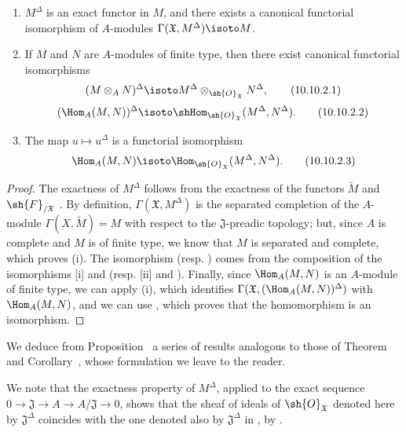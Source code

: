 \begin{proposition}[10.10.2]
\label{I.10.10.2}
\medskip\noindent
\begin{enumerate}
  \item[\rm{(i)}] $M^\Delta$ is an exact functor in $M$, and there exists a canonical functorial isomorphism of $A$-modules $\Gamma(\mathfrak{X},M^\Delta)\isoto M$.
  \item[\rm{(ii)}] If $M$ and $N$ are $A$-modules of finite type, then there exist canonical functorial isomorphisms
    \[
    \label{I.10.10.2.1}
      (M\otimes_A N)^\Delta\isoto M^\Delta\otimes_{\sh{O}_\mathfrak{X}}N^\Delta,
      \tag{10.10.2.1}
    \]
    \[
    \label{I.10.10.2.2}
      (\Hom_A(M,N))^\Delta\isoto\shHom_{\sh{O}_\mathfrak{X}}(M^\Delta,N^\Delta).
      \tag{10.10.2.2}
    \]
  \item[\rm{(iii)}] The map $u\mapsto u^\Delta$ is a functorial isomorphism
    \[
    \label{I.10.10.2.3}
      \Hom_A(M,N)\isoto\Hom_{\sh{O}_\mathfrak{X}}(M^\Delta,N^\Delta).
      \tag{10.10.2.3}
    \]
\end{enumerate}
\end{proposition}

\begin{proof}
The exactness of $M^\Delta$ follows from the exactness of the functors $\widetilde{M}$  and $\sh{F}_{/\mathfrak{X}}$ .
By definition, $\Gamma(\mathfrak{X},M^\Delta)$ is the separated completion of the $A$-module $\Gamma(X,\widetilde{M})=M$ with respect to the $\mathfrak{J}$-preadic topology; but, since $A$ is complete and $M$ is of finite type, we know  that $M$ is separated and complete, which proves (i).
The isomorphism  (resp. ) comes from the composition of the isomorphisms [i] and  (resp. [ii] and ).
Finally, since $\Hom_A(M,N)$ is an $A$-module of finite type, we can apply (i), which identifies $\Gamma(\mathfrak{X},(\Hom_A(M,N))^\Delta)$ with $\Hom_A(M,N)$, and we can use , which proves that the homomorphism  is an isomorphism.
\end{proof}

We deduce from Proposition~ a series of results analogous to those of Theorem~ and Corollary~, whose formulation we leave to the reader.

We note that the exactness property of $M^\Delta$, applied to the exact sequence $0\to\mathfrak{J}\to A\to A/\mathfrak{J}\to 0$, shows that the sheaf of ideals of $\sh{O}_\mathfrak{X}$ denoted here by $\mathfrak{J}^\Delta$ coincides with the one denoted also by $\mathfrak{J}^\Delta$ in , by .

